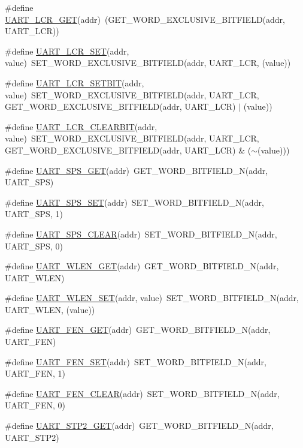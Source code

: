 \begin{DoxyCompactItemize}
\#define \hyperlink{a00574_a2bed098287965a87f7600e13e3c91dce}{UART\_\-LCR\_\-GET}(addr)~(GET\_\-WORD\_\-EXCLUSIVE\_\-BITFIELD(addr, UART\_\-LCR))
\item 
\#define \hyperlink{a00574_a324e133c9a4cf00615cf81a2da8d243f}{UART\_\-LCR\_\-SET}(addr, value)~SET\_\-WORD\_\-EXCLUSIVE\_\-BITFIELD(addr, UART\_\-LCR, (value))
\item 
\#define \hyperlink{a00574_a3c280befd8d13561e20416b077555a44}{UART\_\-LCR\_\-SETBIT}(addr, value)~SET\_\-WORD\_\-EXCLUSIVE\_\-BITFIELD(addr, UART\_\-LCR, GET\_\-WORD\_\-EXCLUSIVE\_\-BITFIELD(addr, UART\_\-LCR) $|$ (value))
\item 
\#define \hyperlink{a00574_a3240b5250caba195183915991f416b80}{UART\_\-LCR\_\-CLEARBIT}(addr, value)~SET\_\-WORD\_\-EXCLUSIVE\_\-BITFIELD(addr, UART\_\-LCR, GET\_\-WORD\_\-EXCLUSIVE\_\-BITFIELD(addr, UART\_\-LCR) \& ($\sim$(value)))
\item 
\#define \hyperlink{a00574_a93be51ca6a0b6ce3670723527801c1fd}{UART\_\-SPS\_\-GET}(addr)~GET\_\-WORD\_\-BITFIELD\_\-N(addr, UART\_\-SPS)
\item 
\#define \hyperlink{a00574_a28b6108a1fa346fe294fd464428047df}{UART\_\-SPS\_\-SET}(addr)~SET\_\-WORD\_\-BITFIELD\_\-N(addr, UART\_\-SPS, 1)
\item 
\#define \hyperlink{a00574_ad1ed03dfcd83b9eb152fdb526f07467e}{UART\_\-SPS\_\-CLEAR}(addr)~SET\_\-WORD\_\-BITFIELD\_\-N(addr, UART\_\-SPS, 0)
\item 
\#define \hyperlink{a00574_aa12d4cd328a29366016f10e5b1c10b0b}{UART\_\-WLEN\_\-GET}(addr)~GET\_\-WORD\_\-BITFIELD\_\-N(addr, UART\_\-WLEN)
\item 
\#define \hyperlink{a00574_aba35e0a8c90cc1d9af87159e574966d7}{UART\_\-WLEN\_\-SET}(addr, value)~SET\_\-WORD\_\-BITFIELD\_\-N(addr, UART\_\-WLEN, (value))
\item 
\#define \hyperlink{a00574_a05cd9bf41e6a1757bd7252e993bf1b98}{UART\_\-FEN\_\-GET}(addr)~GET\_\-WORD\_\-BITFIELD\_\-N(addr, UART\_\-FEN)
\item 
\#define \hyperlink{a00574_ac21afe1751f775576ff38c9b2aad1b9a}{UART\_\-FEN\_\-SET}(addr)~SET\_\-WORD\_\-BITFIELD\_\-N(addr, UART\_\-FEN, 1)
\item 
\#define \hyperlink{a00574_ab935fd37c6016293216400d069e1066e}{UART\_\-FEN\_\-CLEAR}(addr)~SET\_\-WORD\_\-BITFIELD\_\-N(addr, UART\_\-FEN, 0)
\item 
\#define \hyperlink{a00574_acdc7faca57e22cc5bf2c85cb9307af01}{UART\_\-STP2\_\-GET}(addr)~GET\_\-WORD\_\-BITFIELD\_\-N(addr, UART\_\-STP2)
\item 

\end{DoxyCompactItemize}
